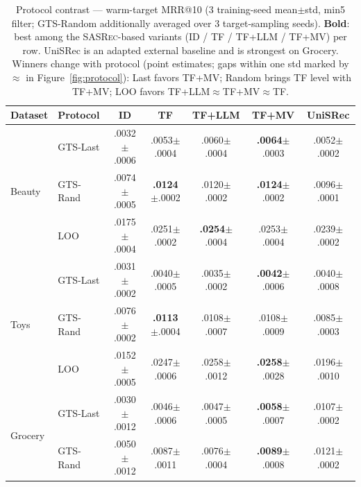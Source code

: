 \documentclass[sigconf,natbib=true,anonymous]{acmart}
\newcommand{\tfllm}{\textsc{TF+LLM}\xspace}
\newcommand{\tfmv}{\textsc{TF+MV}\xspace}
\newcommand{\base}{\textsc{SASRec}\xspace}
\begin{document}
\begin{table}[t]
\centering
\caption{%
Protocol contrast --- warm-target MRR@10 (3 training-seed mean$\pm$std, min5 filter; GTS-Random additionally averaged over 3 target-sampling seeds).
\textbf{Bold}: best among the \base-based variants (ID / TF / TF+LLM / TF+MV) per row.
UniSRec is an adapted external baseline and is strongest on Grocery.
Winners change with protocol (point estimates; gaps within one std marked by $\approx$ in Figure~\ref{fig:protocol}): Last favors \tfmv; Random brings TF level with \tfmv; LOO favors \tfllm$\approx$\tfmv$\approx$TF.%
}
\label{tab:protocol}
\small
\setlength{\tabcolsep}{2.2pt}
\begin{tabular}{@{}llccccc@{}}
\toprule
Dataset & Protocol & ID & TF & TF+LLM & TF+MV & UniSRec \\
\midrule
\multirow{3}{*}{Beauty}
 & GTS-Last  & .0032\tiny{$\pm$.0006} & .0053\tiny{$\pm$.0004} & .0060\tiny{$\pm$.0004} & \textbf{.0064}\tiny{$\pm$.0003} & .0052\tiny{$\pm$.0002} \\
 & GTS-Rand  & .0074\tiny{$\pm$.0005} & \textbf{.0124}\tiny{$\pm$.0002} & .0120\tiny{$\pm$.0002} & \textbf{.0124}\tiny{$\pm$.0002} & .0096\tiny{$\pm$.0001} \\
 & LOO       & .0175\tiny{$\pm$.0004} & .0251\tiny{$\pm$.0002} & \textbf{.0254}\tiny{$\pm$.0004} & .0253\tiny{$\pm$.0004} & .0239\tiny{$\pm$.0002} \\
\midrule
\multirow{3}{*}{Toys}
 & GTS-Last  & .0031\tiny{$\pm$.0002} & .0040\tiny{$\pm$.0005} & .0035\tiny{$\pm$.0002} & \textbf{.0042}\tiny{$\pm$.0006} & .0040\tiny{$\pm$.0008} \\
 & GTS-Rand  & .0076\tiny{$\pm$.0002} & \textbf{.0113}\tiny{$\pm$.0004} & .0108\tiny{$\pm$.0007} & .0108\tiny{$\pm$.0009} & .0085\tiny{$\pm$.0003} \\
 & LOO       & .0152\tiny{$\pm$.0005} & .0247\tiny{$\pm$.0006} & .0258\tiny{$\pm$.0012} & \textbf{.0258}\tiny{$\pm$.0028} & .0196\tiny{$\pm$.0010} \\
\midrule
\multirow{2}{*}{Grocery}
 & GTS-Last  & .0030\tiny{$\pm$.0012} & .0046\tiny{$\pm$.0006} & .0047\tiny{$\pm$.0005} & \textbf{.0058}\tiny{$\pm$.0007} & .0107\tiny{$\pm$.0002} \\
 & GTS-Rand  & .0050\tiny{$\pm$.0012} & .0087\tiny{$\pm$.0011} & .0076\tiny{$\pm$.0004} & \textbf{.0089}\tiny{$\pm$.0008} & .0121\tiny{$\pm$.0002} \\
\bottomrule
\end{tabular}
\end{table}
\end{document}
